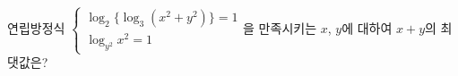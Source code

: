 연립방정식 $\begin{cases} \log_2 \{\log_3 (x^{2}+y^{2})\}=1 \\ \log_{y^{2}} x^{2}=1 \end{cases}$을 만족시키는 $x$, $y$에 대하여 $x+y$의 최댓값은?

